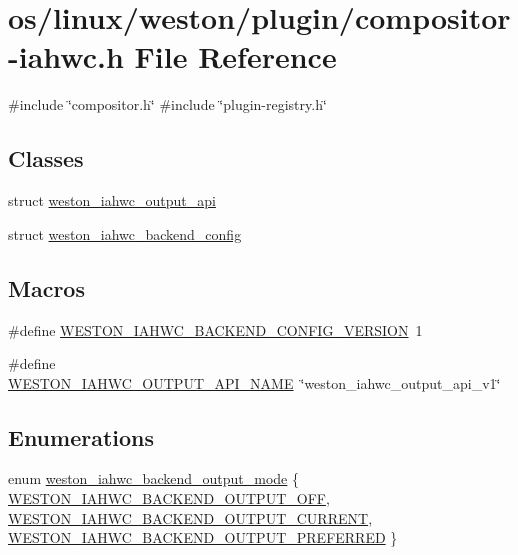 \hypertarget{compositor-iahwc_8h}{}\section{os/linux/weston/plugin/compositor-\/iahwc.\+h File Reference}
\label{compositor-iahwc_8h}
{\ttfamily \#include \char`\"{}compositor.\+h\char`\"{}}\newline
{\ttfamily \#include \char`\"{}plugin-\/registry.\+h\char`\"{}}\newline
\subsection*{Classes}
\begin{DoxyCompactItemize}
\item 
struct \mbox{\hyperlink{structweston__iahwc__output__api}{weston\+\_\+iahwc\+\_\+output\+\_\+api}}
\item 
struct \mbox{\hyperlink{structweston__iahwc__backend__config}{weston\+\_\+iahwc\+\_\+backend\+\_\+config}}
\end{DoxyCompactItemize}
\subsection*{Macros}
\begin{DoxyCompactItemize}
\item 
\#define \mbox{\hyperlink{compositor-iahwc_8h_a2134e720a3d8bfd4599d8eb817766d32}{W\+E\+S\+T\+O\+N\+\_\+\+I\+A\+H\+W\+C\+\_\+\+B\+A\+C\+K\+E\+N\+D\+\_\+\+C\+O\+N\+F\+I\+G\+\_\+\+V\+E\+R\+S\+I\+ON}}~1
\item 
\#define \mbox{\hyperlink{compositor-iahwc_8h_a793453a6749225ff3efcf6c616bde15a}{W\+E\+S\+T\+O\+N\+\_\+\+I\+A\+H\+W\+C\+\_\+\+O\+U\+T\+P\+U\+T\+\_\+\+A\+P\+I\+\_\+\+N\+A\+ME}}~\char`\"{}weston\+\_\+iahwc\+\_\+output\+\_\+api\+\_\+v1\char`\"{}
\end{DoxyCompactItemize}
\subsection*{Enumerations}
\begin{DoxyCompactItemize}
\item 
enum \mbox{\hyperlink{compositor-iahwc_8h_a992bc1439aa5a0996040fdde612744e1}{weston\+\_\+iahwc\+\_\+backend\+\_\+output\+\_\+mode}} \{ \mbox{\hyperlink{compositor-iahwc_8h_a992bc1439aa5a0996040fdde612744e1aeda3129e5f8207686be76ebd7c03fb93}{W\+E\+S\+T\+O\+N\+\_\+\+I\+A\+H\+W\+C\+\_\+\+B\+A\+C\+K\+E\+N\+D\+\_\+\+O\+U\+T\+P\+U\+T\+\_\+\+O\+FF}}, 
\mbox{\hyperlink{compositor-iahwc_8h_a992bc1439aa5a0996040fdde612744e1a65d4805102cbcb6aed1572189d192034}{W\+E\+S\+T\+O\+N\+\_\+\+I\+A\+H\+W\+C\+\_\+\+B\+A\+C\+K\+E\+N\+D\+\_\+\+O\+U\+T\+P\+U\+T\+\_\+\+C\+U\+R\+R\+E\+NT}}, 
\mbox{\hyperlink{compositor-iahwc_8h_a992bc1439aa5a0996040fdde612744e1a119203de423230e93c55e7325fd238b9}{W\+E\+S\+T\+O\+N\+\_\+\+I\+A\+H\+W\+C\+\_\+\+B\+A\+C\+K\+E\+N\+D\+\_\+\+O\+U\+T\+P\+U\+T\+\_\+\+P\+R\+E\+F\+E\+R\+R\+ED}}
 \}
\end{DoxyCompactItemize}


